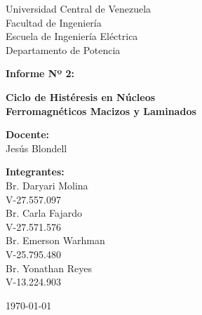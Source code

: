 \begin{titlepage}
    \centering
    \Large
    Universidad Central de Venezuela\\
    Facultad de Ingeniería\\
    Escuela de Ingeniería Eléctrica\\
    Departamento de Potencia
    \vspace*{6.5cm}

    \Huge
    \textbf{Informe Nº 2:}

    \textbf{Ciclo de Histéresis en Núcleos\\ Ferromagnéticos Macizos y Laminados}
    \vfill


    \Large

    \begin{minipage}[t]{0.45\textwidth}
        \raggedright
        \textbf{Docente:}\\
        Jesús Blondell
    \end{minipage}%
    \hfill
    \begin{minipage}[t]{0.45\textwidth}
        \raggedleft
        \textbf{Integrantes:}\\
        Br. Daryari Molina\\
        V-27.557.097\\
        Br. Carla Fajardo\\
        V-27.571.576\\
        Br. Emerson Warhman\\
        V-25.795.480\\
        Br. Yonathan Reyes\\
        V-13.224.903
    \end{minipage}
    \vfill
    \today

\end{titlepage}
